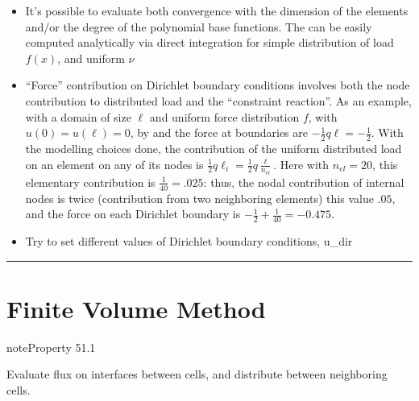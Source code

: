 \documentclass[letterpaper,10pt,english]{jupyterBook}
\begin{document}
\sphinxAtStartPar
{}
\begin{itemize}
\item {} 
\sphinxAtStartPar
{} It’s possible to evaluate both convergence with the dimension of the elements and/or the degree of the polynomial base functions. The  can be easily computed analytically via direct integration for simple distribution of load \(f(x)\), and uniform \(\nu\)

\item {} 
\sphinxAtStartPar
{} “Force” contribution on Dirichlet boundary conditions involves both the node contribution to distributed load and the “constraint reaction”. As an example, with a domain of size \(\ell\) and uniform force distribution \(f\), with \(u(0) = u(\ell) = 0\), by  and  the force at boundaries are \(-\frac{1}{2} q \ell = - \frac{1}{2}\). With the modelling choices done, the contribution of the uniform distributed load on an element on any of its nodes is \(\frac{1}{2} q \ell_i = \frac{1}{2} q \frac{\ell}{n_{el}}\). Here with \(n_{el} = 20\), this elementary contribution is \(\frac{1}{40} = .025\): thus, the nodal contribution of internal nodes is twice (contribution from two neighboring elements) this value \(.05\), and the force on each Dirichlet boundary is \(-\frac{1}{2} + \frac{1}{40} = - 0.475\).

\item {} 
\sphinxAtStartPar
Try to set different values of Dirichlet boundary conditions, u\_dir

\end{itemize}


\bigskip\hrule\bigskip


\sphinxstepscope


\chapter{Finite Volume Method}
\label{\detokenize{ch/pde/fvm:finite-volume-method}}\label{\detokenize{ch/pde/fvm:pde-fvm}}\label{\detokenize{ch/pde/fvm::doc}}\label{ch/pde/fvm:fvm:property:conservation}
\begin{sphinxadmonition}{note}{Property 51.1}



\sphinxAtStartPar
Evaluate flux on interfaces between cells, and distribute between neighboring cells.
\end{sphinxadmonition}
\end{document}
